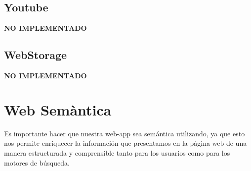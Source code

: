 \documentclass{article}
\begin{document}
\subsection{Youtube}
\textbf{NO IMPLEMENTADO}
\subsection{WebStorage}
\textbf{NO IMPLEMENTADO}

\section{Web Semàntica}
Es importante hacer que nuestra web-app sea semántica utilizando, ya que esto nos permite enriquecer la información que presentamos en la página web de una manera estructurada y comprensible tanto para los usuarios como para los motores de búsqueda.\\
\end{document}

